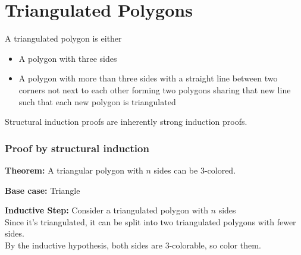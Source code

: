 \section{Triangulated Polygons}

A triangulated polygon is either

\begin{itemize}
    \item A polygon with three sides
    \item A polygon with more than three sides with a straight line between two corners not next to each other forming two polygons sharing that new line such that each new polygon is triangulated
\end{itemize}

Structural induction proofs are inherently strong induction proofs.

\subsubsection*{Proof by structural induction}

\textbf{Theorem:} A triangular polygon with $n$ sides can be 3-colored.

\textbf{Base case:} Triangle

\textbf{Inductive Step:} Consider a triangulated polygon with $n$ sides\\
Since it's triangulated, it can be split into two triangulated polygons with fewer sides.\\
By the inductive hypothesis, both sides are 3-colorable, so color them.\\
